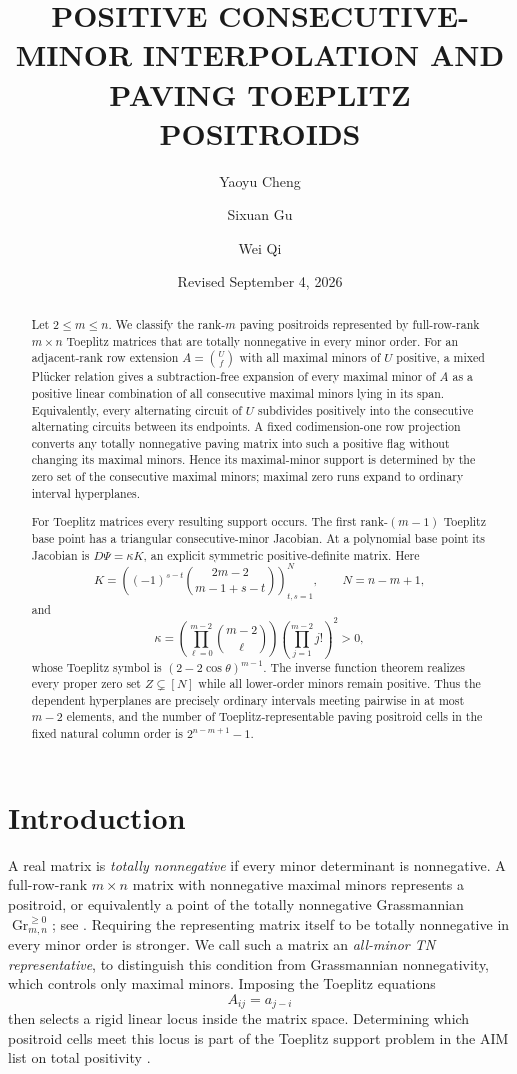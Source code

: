 \documentclass{amsart}
\title[PAVING TOEPLITZ POSITROIDS]{POSITIVE CONSECUTIVE-MINOR INTERPOLATION AND PAVING TOEPLITZ POSITROIDS}
\date{Revised September 4, 2026}
\author{Yaoyu Cheng}
\author{Sixuan Gu}
\author{Wei Qi}
\numberwithin{equation}{section}
\theoremstyle{definition}
\theoremstyle{remark}
\DeclareMathOperator{\Gr}{Gr}
\begin{document}
\begin{abstract}
Let $2\le m\le n$.  We classify the rank-$m$ paving positroids represented by full-row-rank $m\times n$ Toeplitz matrices that are totally nonnegative in every minor order.  For an adjacent-rank row extension $A=\binom{U}{f}$ with all maximal minors of $U$ positive, a mixed Pl\"ucker relation gives a subtraction-free expansion of every maximal minor of $A$ as a positive linear combination of all consecutive maximal minors lying in its span.  Equivalently, every alternating circuit of $U$ subdivides positively into the consecutive alternating circuits between its endpoints.  A fixed codimension-one row projection converts any totally nonnegative paving matrix into such a positive flag without changing its maximal minors.  Hence its maximal-minor support is determined by the zero set of the consecutive maximal minors; maximal zero runs expand to ordinary interval hyperplanes.

For Toeplitz matrices every resulting support occurs.  The first rank-$(m-1)$ Toeplitz base point has a triangular consecutive-minor Jacobian.  At a polynomial base point its Jacobian is $D\Psi=\kappa K$, an explicit symmetric positive-definite matrix.  Here
\[
 K=\left((-1)^{s-t}\binom{2m-2}{m-1+s-t}\right)_{t,s=1}^N,
 \qquad N=n-m+1,
\]
and
\[
 \kappa=\left(\prod_{\ell=0}^{m-2}\binom{m-2}{\ell}\right)
 \left(\prod_{j=1}^{m-2}j!\right)^2>0,
\]
whose Toeplitz symbol is $(2-2\cos\theta)^{m-1}$.  The inverse function theorem realizes every proper zero set $Z\subsetneq[N]$ while all lower-order minors remain positive.  Thus the dependent hyperplanes are precisely ordinary intervals meeting pairwise in at most $m-2$ elements, and the number of Toeplitz-representable paving positroid cells in the fixed natural column order is $2^{n-m+1}-1$.
\end{abstract}

\maketitle

\section{Introduction}\label{sec:introduction}

A real matrix is \emph{totally nonnegative} if every minor determinant is nonnegative.  A full-row-rank $m\times n$ matrix with nonnegative maximal minors represents a positroid, or equivalently a point of the totally nonnegative Grassmannian $\Gr_{m,n}^{\ge0}$; see \cite{FJ,Postnikov}.  Requiring the representing matrix itself to be totally nonnegative in every minor order is stronger.  We call such a matrix an \emph{all-minor TN representative}, to distinguish this condition from Grassmannian nonnegativity, which controls only maximal minors.  Imposing the Toeplitz equations
\[
 A_{ij}=a_{j-i}
\]
then selects a rigid linear locus inside the matrix space.  Determining which positroid cells meet this locus is part of the Toeplitz support problem in the AIM list on total positivity \cite{AIM}.
\end{document}
